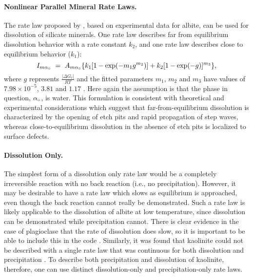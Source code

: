 \paragraph{Nonlinear Parallel Mineral Rate Laws.}

The rate law proposed by \citet{hellmann2006dissolution}, based on experimental data for albite, can be used for dissolution of silicate minerals. One rate law describes far from equilibrium dissolution behavior with a rate constant $k_2$, and one rate law describes close to equilibrium behavior ($k_1$):
\begin{equation}  \label{eq:Mineral6} 
  I_{m{\alpha}_\circ} \ =\  A_{m{\alpha}_\circ}  \{ k_{1} [1-\exp (-m_{1} g^{m_{2} } )]+k_{2} [1-\exp (-g)]^{m_{3} }  \},
\end{equation}                
where $g$ represents $\frac{|\Delta G_r|}{RT}$ and the fitted parameters $m_1$, $m_2$ and $m_3$ have values of $7.98 \times 10^{-5}$, $3.81$ and $1.17$ \citep{hellmann2006dissolution}. Here again the assumption is that the phase in question, ${\alpha}_\circ$, is water.  This formulation is consistent with theoretical and experimental considerations which suggest that far-from-equilibrium dissolution is characterized by the opening of etch pits and rapid propagation of step waves, whereas close-to-equilibrium dissolution in the absence of etch pits is localized to surface defects. 

\paragraph{Dissolution Only.}

The simplest form of a dissolution only rate law would be a completely irreversible reaction with no back reaction (i.e., no precipitation).  However, it may be desirable to have a rate law which slows as equilibrium is approached, even though the back reaction cannot really be demonstrated.  Such a rate law is likely applicable to the dissolution of albite at low temperature, since dissolution can be demonstrated while precipitation cannot.  There is clear evidence in the case of plagioclase that the rate of dissolution does slow, so it is important to be able to include this in the code \citep{maher2009role}.  Similarly, it was found that kaolinite could not be described with a single rate law that was continuous for both dissolution and precipitation \citep{yang2008kaolinite}.  To describe both precipitation and dissolution of kaolinite, therefore, one can use distinct dissolution-only and precipitation-only rate laws.

